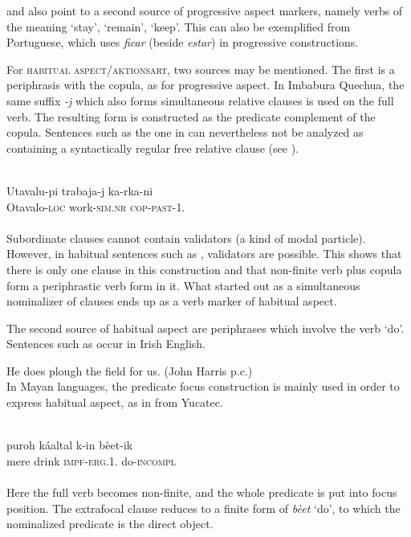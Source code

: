 \citet[§5]{Givón1973} and \citet[124-126]{HeineEtAl1984} also point to a second source of progressive aspect markers, namely verbs of the meaning ‘stay’, ‘remain’, ‘keep’. This can also be exemplified from Portuguese, which uses \textit{ficar} (beside \textit{estar}) in progressive constructions.

\label{page33b}For \textsc{habitual aspect/aktionsart}, two sources may be mentioned. The first is a periphrasis with the copula, as for progressive aspect. In Imbabura Quechua, the same suffix \textit{{}-j} which also forms simultaneous relative clauses is used on the full verb. The resulting form is constructed as the predicate complement of the copula. Sentences such as the one in  can nevertheless not be analyzed as containing a syntactically regular free relative clause (see \citealt[149]{Cole1982}).

\ea\label{ex:E4}
\\
\gll Utavalu-pi  trabaja-j  ka-rka-ni\\
Otavalo-\textsc{loc}  work-\textsc{sim}.\textsc{nr}  \textsc{cop}-\textsc{past}-1.\glsg\\
\\
\z
\noindent Subordinate clauses cannot contain validators (a kind of modal particle). However, in habitual sentences such as , validators are possible. This shows that there is only one clause in this construction and that non-finite verb plus copula form a periphrastic verb form in it. What started out as a simultaneous nominalizer of clauses ends up as a verb marker of habitual aspect.\label{page34}

The second source of habitual aspect are periphrases which involve the verb ‘do’. Sentences such as  occur in Irish English.

\ea\label{ex:E5} He does plough the field for us. \textup{(John Harris p.c.)}\\
\z
\noindent In Mayan languages, the predicate focus construction is mainly used in order to express habitual aspect, as in  from Yucatec.

\ea\label{ex:E6}
\\
\gll puroh  káaltal  k-in  bèet-ik\\
 mere  drink  {\textsc{impf}-\textsc{erg}.1.\glsg}  do-\textsc{incompl}\\
\\
\z
\noindent Here the full verb becomes non-finite, and the whole predicate is put into focus position. The extrafocal clause reduces to a finite form of \textit{bèet} ‘do’, to which the nominalized predicate is the direct object.

